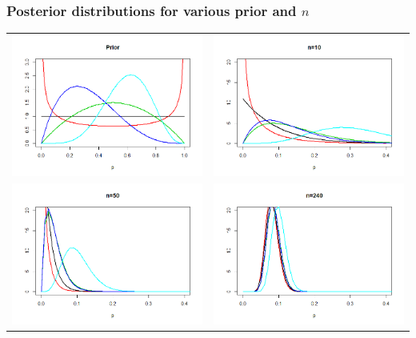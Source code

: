 \begin{frame}[fragile]\frametitle{Posterior distributions for various prior and $n$}
\centering
\begin{tabular}{cc}
   \includegraphics[width=0.4\linewidth]{figures/prior_beta.png} &
   \includegraphics[width=0.4\linewidth]{figures/post_n=10.png} \\
      \includegraphics[width=0.4\linewidth]{figures/post_n=50.png}&
   \includegraphics[width=0.4\linewidth]{figures/post_n=240.png} \\
\end{tabular}\\
\end{frame}


